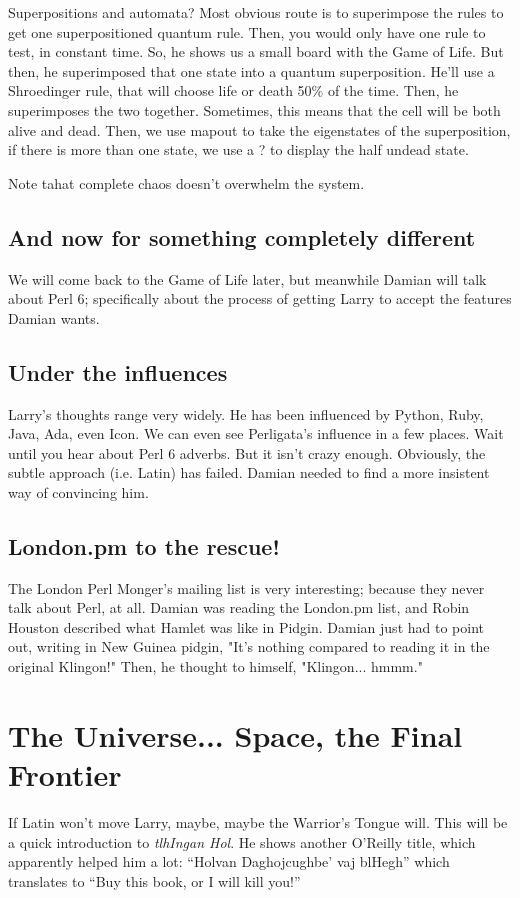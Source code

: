 \documentclass{article}
\begin{document}
Superpositions and automata?  Most obvious route is to superimpose the
rules to get one superpositioned quantum rule.  Then, you would only
have one rule to test, in constant time.  So, he shows us a small board
with the Game of Life.  But then, he superimposed that one state into a
quantum superposition.  He'll use a Shroedinger rule, that will choose
life or death 50\% of the time.  Then, he superimposes the two together.
Sometimes, this means that the cell will be both alive and dead.  Then,
we use mapout to take the eigenstates of the superposition, if there is
more than one state, we use a ? to display the half undead state.

Note tahat complete chaos doesn't overwhelm the system.

\subsection{And now for something completely different}
We will come back to the Game of Life later, but meanwhile Damian will 
talk about Perl 6;
specifically about the process of getting Larry to accept the
features Damian wants.

\subsection{Under the influences}
Larry's thoughts range very widely.  He has been influenced by
Python, Ruby, Java, Ada, even
Icon.  We can even see Perligata's influence in a few places.  Wait
until you hear about Perl 6 adverbs.  But it isn't crazy enough.
Obviously, the subtle approach (i.e. Latin) has failed.  Damian needed 
to find a more insistent way of convincing him.

\subsection{London.pm to the rescue!}
The London Perl Monger's mailing list is very interesting; because
they never talk about Perl, at all.  Damian was reading the London.pm
list, and Robin Houston described what Hamlet was like in Pidgin.
Damian
just had to point out, writing in New Guinea pidgin, "It's nothing 
compared to reading it in the original Klingon!"  Then, he thought 
to himself, "Klingon... hmmm."

\section{The Universe... Space, the Final Frontier}
If Latin won't move Larry, maybe, maybe the Warrior's Tongue will.  This
will be a quick introduction to \textit{tlhIngan Hol}.  He shows 
another O'Reilly title, which apparently helped him a lot:
``Holvan Daghojcughbe' vaj blHegh'' which translates to ``Buy this book, or I 
will kill you!''
\end{document}
